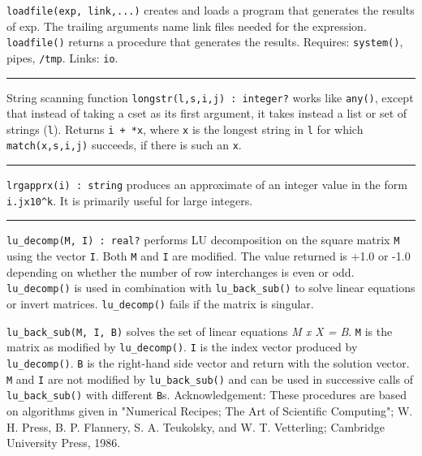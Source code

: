 \texttt{loadfile(exp, link,...)} creates and loads a program that
generates the results of exp. The trailing arguments name link files
needed for the expression. \texttt{loadfile()} returns a procedure that
generates the results.
Requires: \texttt{system()}, pipes, \texttt{/tmp}. Links:
\texttt{io}. 

\vspace{0.25cm}\hrule{}

String scanning function \texttt{longstr(l,s,i,j) : integer?} works like
\texttt{any()}, except that instead of taking a cset as its first
argument, it takes instead a list or set of strings (\texttt{l}).
Returns \texttt{i + *x}, where \texttt{x} is the longest string in \texttt{l} for which \texttt{match(x,s,i,j)}
succeeds, if there is such an \texttt{x}.

\vspace{0.25cm}\hrule{}

\texttt{lrgapprx(i) : string} produces an approximate of an integer
value in the form \texttt{i.jx10\^{}k}. It is primarily useful for
large integers. 

\vspace{0.25cm}\hrule{}

\texttt{lu\_decomp(M, I) : real?} performs LU
decomposition on the square matrix \texttt{M} using the vector
\texttt{I}. Both \texttt{M} and \texttt{I} are modified. The value
returned is +1.0 or -1.0 depending on whether the number of row
interchanges is even or odd. \texttt{lu\_decomp()} is used in
combination with \texttt{lu\_back\_sub()} to solve linear equations or
invert matrices. \texttt{lu\_decomp()} fails if the matrix is singular.

\texttt{lu\_back\_sub(M, I, B)} solves the set of linear equations
\textit{M x X = B}. \texttt{M} is the matrix as modified by
\texttt{lu\_decomp()}. \texttt{I} is the index vector produced by
\texttt{lu\_decomp()}. \texttt{B} is the right-hand side vector and
return with the solution vector. \texttt{M} and \texttt{I} are not
modified by \texttt{lu\_back\_sub()} and can be used in successive
calls of \texttt{lu\_back\_sub()} with different \texttt{B}s.
Acknowledgement: These procedures are based on algorithms given in
"Numerical Recipes; The Art of Scientific
Computing"; W. H. Press, B. P. Flannery, S. A.
Teukolsky, and W. T. Vetterling; Cambridge University Press, 1986.


